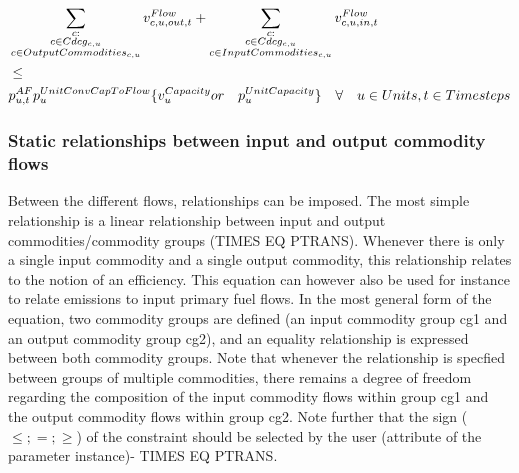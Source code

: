 
\begin{align} \label{eq:max_capacity}
&\sum_{\substack{\commodity :  \\ \commodity \in \Cdcg \\ \commodity \in \OutputCommodities}} \vFlow[\commodity, \unit, out, \timestep] + \sum_{\substack{\commodity :  \\ \commodity \in \Cdcg \\ \commodity \in \InputCommodities}} \vFlow[\commodity, \unit, in, \timestep] \nonumber \\
&  \le \nonumber \\
&\pAF \pUnitConvCapToFlow \{\vCapacity or \quad \pUnitCapacity\} \quad \forall \quad \units, \timesteps
\end{align}



\subsubsection{Static relationships between input and output commodity flows}
Between the different flows, relationships can be imposed. The most simple relationship is a linear relationship between input and output commodities/commodity groups (TIMES EQ PTRANS). Whenever there is only a single input commodity and a single output commodity, this relationship relates to the notion of an efficiency. This equation can however also be used for instance to relate emissions to input primary fuel flows. In the most general form of the equation, two commodity groups are defined (an input commodity group cg1 and an output commodity group cg2), and an equality relationship is expressed between both commodity groups. Note that whenever the relationship is specfied between groups of multiple commodities, there remains a degree of freedom regarding the composition of the input commodity flows within group cg1 and the output commodity flows within group cg2. Note further that the sign ($\le;=;\ge$) of the constraint should be selected by the user (attribute of the parameter instance)- TIMES EQ PTRANS. 

